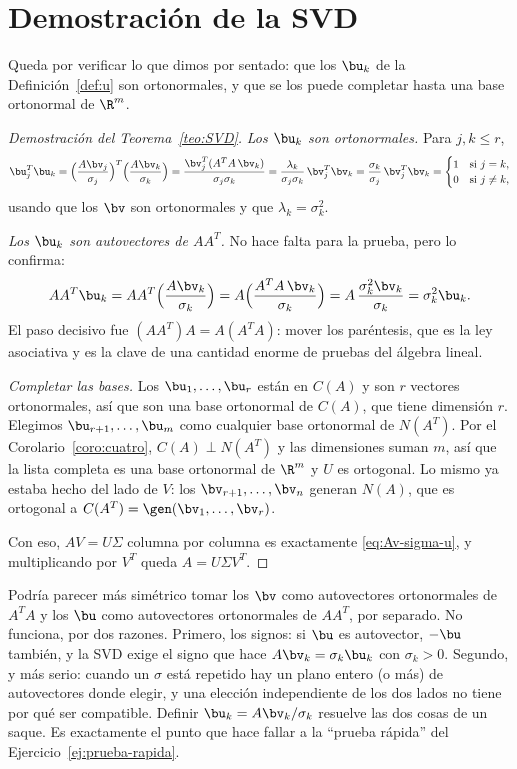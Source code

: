 \section{Demostración de la SVD}
\label{sec:prueba-SVD}

Queda por verificar lo que dimos por sentado: que los $\bu_k$ de la
Definición~\ref{def:u} son ortonormales, y que se los puede completar hasta
una base ortonormal de $\R^m$.

\begin{proof}[Demostración del Teorema~\ref{teo:SVD}]
\emph{Los $\bu_k$ son ortonormales.} Para $j,k\le r$,
\[
\bu_j^T\bu_k
=\Bigl(\frac{A\bv_j}{\sigma_j}\Bigr)^T\Bigl(\frac{A\bv_k}{\sigma_k}\Bigr)
=\frac{\bv_j^T(A^TA\,\bv_k)}{\sigma_j\sigma_k}
=\frac{\lambda_k}{\sigma_j\sigma_k}\,\bv_j^T\bv_k
=\frac{\sigma_k}{\sigma_j}\,\bv_j^T\bv_k
=\begin{cases}1&\text{si }j=k,\\ 0&\text{si }j\neq k,\end{cases}
\]
usando que los $\bv$ son ortonormales y que $\lambda_k=\sigma_k^2$.

\emph{Los $\bu_k$ son autovectores de $AA^T$.} No hace falta para la prueba,
pero lo confirma:
\[
AA^T\bu_k=AA^T\Bigl(\frac{A\bv_k}{\sigma_k}\Bigr)
=A\Bigl(\frac{A^TA\,\bv_k}{\sigma_k}\Bigr)
=A\,\frac{\sigma_k^2\bv_k}{\sigma_k}=\sigma_k^2\bu_k .
\]
El paso decisivo fue $(AA^T)A=A(A^TA)$: mover los paréntesis, que es la ley
asociativa y es la clave de una cantidad enorme de pruebas del álgebra lineal.

\emph{Completar las bases.} Los $\bu_1,\dots,\bu_r$ están en $C(A)$ y son $r$
vectores ortonormales, así que son una base ortonormal de $C(A)$, que tiene
dimensión $r$. Elegimos $\bu_{r+1},\dots,\bu_m$ como cualquier base
ortonormal de $N(A^T)$. Por el Corolario~\ref{coro:cuatro},
$C(A)\perp N(A^T)$ y las dimensiones suman $m$, así que la lista completa es
una base ortonormal de $\R^m$ y $U$ es ortogonal. Lo mismo ya estaba hecho del
lado de $V$: los $\bv_{r+1},\dots,\bv_n$ generan $N(A)$, que es ortogonal a
$C(A^T)=\gen(\bv_1,\dots,\bv_r)$.

Con eso, $AV=U\Sigma$ columna por columna es exactamente
\eqref{eq:Av-sigma-u}, y multiplicando por $V^T$ queda $A=U\Sigma V^T$.
\end{proof}

\begin{remark}
Podría parecer más simétrico tomar los $\bv$ como autovectores ortonormales
de $A^TA$ y los $\bu$ como autovectores ortonormales de $AA^T$, por separado.
No funciona, por dos razones. Primero, los signos: si $\bu$ es autovector,
$-\bu$ también, y la SVD exige el signo que hace $A\bv_k=\sigma_k\bu_k$ con
$\sigma_k>0$. Segundo, y más serio: cuando un $\sigma$ está repetido hay un
plano entero (o más) de autovectores donde elegir, y una elección
independiente de los dos lados no tiene por qué ser compatible. Definir
$\bu_k=A\bv_k/\sigma_k$ resuelve las dos cosas de un saque. Es exactamente el
punto que hace fallar a la ``prueba rápida'' del Ejercicio~\ref{ej:prueba-rapida}.
\end{remark}


